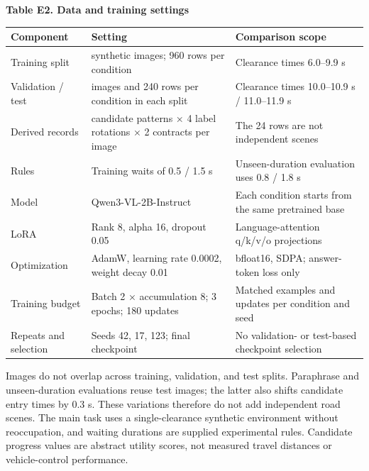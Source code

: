 \documentclass[11pt,a4paper]{article}
\begin{document}
\par\medskip\noindent\begin{minipage}{\linewidth}
\textbf{Table E2. Data and training settings}\par

\par\medskip\noindent\begin{minipage}{\linewidth}\small
\begin{tabular}{@{}>{\raggedright\arraybackslash}p{}>{\raggedright\arraybackslash}p{}>{\raggedright\arraybackslash}p{}@{}}
\toprule
\textbf{Component} & \textbf{Setting} & \textbf{Comparison scope} \\
\midrule
Training split & 40 synthetic images; 960 rows per condition & Clearance times 6.0–9.9 s \\
Validation / test & 10 images and 240 rows per condition in each split & Clearance times 10.0–10.9 s / 11.0–11.9 s \\
Derived records & 3 candidate patterns × 4 label rotations × 2 contracts per image & The 24 rows are not independent scenes \\
Rules & Training waits of 0.5 / 1.5 s & Unseen-duration evaluation uses 0.8 / 1.8 s \\
Model & Qwen3-VL-2B-Instruct & Each condition starts from the same pretrained base \\
LoRA & Rank 8, alpha 16, dropout 0.05 & Language-attention q/k/v/o projections \\
Optimization & AdamW, learning rate 0.0002, weight decay 0.01 & bfloat16, SDPA; answer-token loss only \\
Training budget & Batch 2 × accumulation 8; 3 epochs; 180 updates & Matched examples and updates per condition and seed \\
Repeats and selection & Seeds 42, 17, 123; final checkpoint & No validation- or test-based checkpoint selection \\
\bottomrule\end{tabular}\end{minipage}\par\medskip
\end{minipage}\par\medskip

Images do not overlap across training, validation, and test splits. Paraphrase and unseen-duration evaluations reuse test images; the latter also shifts candidate entry times by 0.3 s. These variations therefore do not add independent road scenes. The main task uses a single-clearance synthetic environment without reoccupation, and waiting durations are supplied experimental rules. Candidate progress values are abstract utility scores, not measured travel distances or vehicle-control performance.\par
\end{document}

